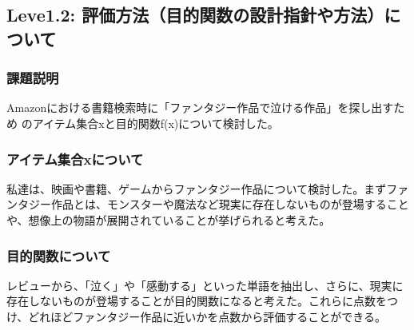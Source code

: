\subsection{Leve1.2: 評価方法（目的関数の設計指針や方法）について}
\subsubsection{課題説明}
Amazonにおける書籍検索時に「ファンタジー作品で泣ける作品」を探し出すため
のアイテム集合xと目的関数f(x)について検討した。

\subsubsection{アイテム集合xについて}
私達は、映画や書籍、ゲームからファンタジー作品について検討した。まずファンタジー作品とは、モンスターや魔法など現実に存在しないものが登場することや、想像上の物語が展開されていることが挙げられると考えた。

\subsubsection{目的関数について}
レビューから、「泣く」や「感動する」といった単語を抽出し、さらに、現実に存在しないものが登場することが目的関数になると考えた。これらに点数をつけ、どれほどファンタジー作品に近いかを点数から評価することができる。



